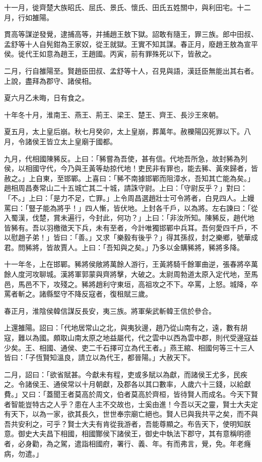 \begin{pinyinscope}
十一月，徙齊楚大族昭氏、屈氏、景氏、懷氏、田氏五姓關中，與利田宅。十二月，行如雒陽。

貫高等謀逆發覺，逮捕高等，并捕趙王敖下獄。詔敢有隨王，罪三族。郎中田叔、孟舒等十人自髡鉗為王家奴，從王就獄。王實不知其謀。春正月，廢趙王敖為宣平侯。徙代王如意為趙王，王趙國。丙寅，前有罪殊死以下，皆赦之。

二月，行自雒陽至。賢趙臣田叔、孟舒等十人，召見與語，漢廷臣無能出其右者。上說，盡拜為郡守、諸侯相。

夏六月乙未晦，日有食之。

十年冬十月，淮南王、燕王、荊王、梁王、楚王、齊王、長沙王來朝。

夏五月，太上皇后崩。秋七月癸卯，太上皇崩，葬萬年。赦櫟陽囚死罪以下。八月，令諸侯王皆立太上皇廟于國都。

九月，代相國陳豨反。上曰：「豨嘗為吾使，甚有信。代地吾所急，故封豨為列侯，以相國守代，今乃與王黃等劫掠代地！吏民非有罪也，能去豨、黃來歸者，皆赦之。」上自東，至邯鄲。上喜曰：「豨不南據邯鄲而阻漳水，吾知其亡能為矣。」趙相周昌奏常山二十五城亡其二十城，請誅守尉。上曰：「守尉反乎？」對曰：「不。」上曰：「是力不足，亡罪。」上令周昌選趙壯士可令將者，白見四人。上嫚罵曰：「豎子能為將乎！」四人慚，皆伏地。上封各千戶，以為將。左右諫曰：「從入蜀漢，伐楚，賞未遍行，今封此，何功？」上曰：「非汝所知。陳豨反，趙代地皆豨有。吾以羽檄徵天下兵，未有至者，今計唯獨邯鄲中兵耳。吾何愛四千戶，不以慰趙子弟！」皆曰：「善。」又求「樂毅有後乎？」得其孫叔，封之樂鄉，號華成君。問豨將，皆故賈人。上曰：「吾知與之矣。」乃多以金購豨將，豨將多降。

十一年冬，上在邯鄲。豨將侯敞將萬餘人游行，王黃將騎千餘軍曲逆，張春將卒萬餘人度河攻聊城。漢將軍郭蒙與齊將擊，大破之。太尉周勃道太原入定代地，至馬邑，馬邑不下，攻殘之。豨將趙利守東垣，高祖攻之不下。卒罵，上怒。城降，卒罵者斬之。諸縣堅守不降反寇者，復租賦三歲。

春正月，淮陰侯韓信謀反長安，夷三族。將軍柴武斬韓王信於參合。

上還雒陽。詔曰：「代地居常山之北，與夷狄邊，趙乃從山南有之，遠，數有胡寇，難以為國。頗取山南太原之地益屬代，代之雲中以西為雲中郡，則代受邊寇益少矣。王、相國、通侯、吏二千石擇可立為代王者。」燕王綰、相國何等三十三人皆曰：「子恆賢知溫良，請立以為代王，都晉陽。」大赦天下。

二月，詔曰：「欲省賦甚。今獻未有程，吏或多賦以為獻，而諸侯王尤多，民疾之。令諸侯王、通侯常以十月朝獻，及郡各以其口數率，人歲六十三錢，以給獻費。」又曰：「蓋聞王者莫高於周文，伯者莫高於齊桓，皆待賢人而成名。今天下賢者智能豈特古之人乎？患在人主不交故也，士奚由進！今吾以天之靈，賢士大夫定有天下，以為一家，欲其長久，世世奉宗廟亡絕也。賢人已與我共平之矣，而不與吾共安利之，可乎？賢士大夫有肯從我游者，吾能尊顯之。布告天下，使明知朕意。御史大夫昌下相國，相國酇侯下諸侯王，御史中執法下郡守，其有意稱明德者，必身勸，為之駕，遣詣相國府，署行、義、年。有而弗言，覺，免。年老癃病，勿遣。」


\end{pinyinscope}
